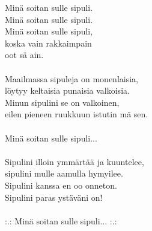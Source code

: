 
Minä soitan sulle sipuli. \\
Minä soitan sulle sipuli. \\
Minä soitan sulle sipuli, \\
koska vain rakkaimpain \\
oot sä ain. \\
\hspace{10mm} \\
Maailmassa sipuleja on monenlaisia, \\
löytyy keltaisia punaisia valkoisia. \\
Minun sipulini se on valkoinen, \\
eilen pieneen ruukkuun istutin mä sen. \\
\hspace{10mm} \\
Minä soitan sulle sipuli... \\
\hspace{10mm} \\
Sipulini illoin ymmärtää ja kuuntelee, \\
sipulini mulle aamulla hymyilee. \\
Sipulini kanssa en oo onneton. \\
Sipulini paras ystäväni on! \\
\hspace{10mm} \\
:.: Minä soitan sulle sipuli... :.: \\